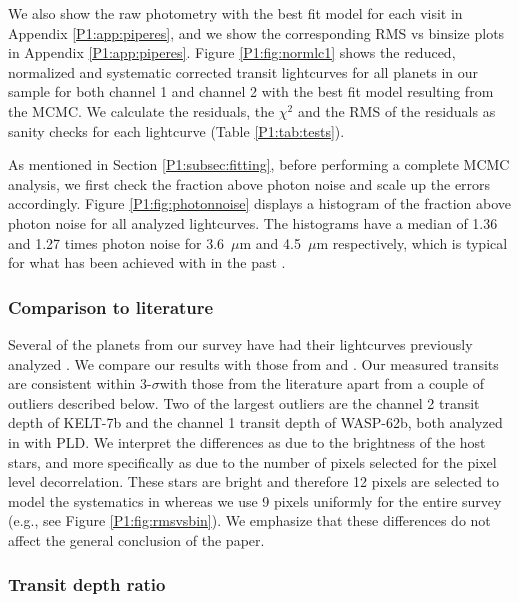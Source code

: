 We also show the raw photometry with the best fit model for each visit in Appendix \ref{P1:app:piperes}, and we show the corresponding RMS vs binsize plots in Appendix \ref{P1:app:piperes}. Figure \ref{P1:fig:normlc1} shows the reduced, normalized and systematic corrected transit lightcurves for all planets in our sample for both channel 1 and channel 2 with the best fit model resulting from the MCMC. We calculate the residuals, the $\chi^2$ and the RMS of the residuals as sanity checks for each lightcurve (Table \ref{P1:tab:tests}).

As mentioned in Section \ref{P1:subsec:fitting}, before performing a complete MCMC analysis, we first check the fraction above photon noise and scale up the errors accordingly. Figure \ref{P1:fig:photonnoise} displays a histogram of the fraction above photon noise for all analyzed lightcurves. The histograms have a median of 1.36 and 1.27 times photon noise for 3.6~$\mu$m and 4.5~$\mu$m respectively, which is typical for what has been achieved with \spitzer in the past \citep{Ingalls2016}.

\subsubsection{Comparison to literature}

Several of the planets from our survey have had their \spitzer lightcurves previously analyzed \citet[e.g.,][]{Sing2016, Garhart2020}. We compare our results with those from \citet{Sing2016} and \citet{Garhart2020}. Our measured transits are consistent within 3-$\sigma$with those from the literature apart from a couple of outliers described below. Two of the largest outliers are the channel 2 transit depth of KELT-7b and the channel 1 transit depth of WASP-62b, both analyzed in \citet{Garhart2020} with PLD. We interpret the differences as due to the brightness of the host stars, and more specifically as due to the number of pixels selected for the pixel level decorrelation. These stars are bright and therefore 12 pixels are selected to model the systematics in \citet{Garhart2020} whereas we use 9 pixels uniformly for the entire survey (e.g., see Figure \ref{P1:fig:rmsvsbin}). We emphasize that these differences do not affect the general conclusion of the paper.

\subsubsection{Transit depth ratio}
\label{P1:subsec:transit}


